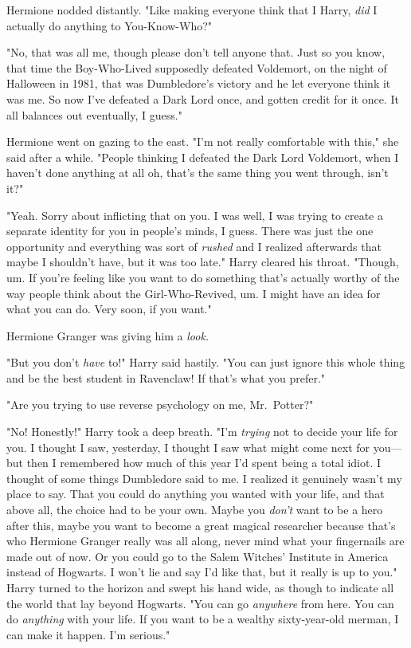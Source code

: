 Hermione nodded distantly. "Like making everyone think that I{\el} Harry,
\emph{did} I actually do anything to You-Know-Who?"

"No, that was all me, though please don't tell anyone that. Just so you know,
that time the Boy-Who-Lived supposedly defeated Voldemort, on the night of
Halloween in 1981, that was Dumbledore's victory and he let everyone think it
was me. So now I've defeated a Dark Lord once, and gotten credit for it once.
It all balances out eventually, I guess."

Hermione went on gazing to the east. "I'm not really comfortable with this,"
she said after a while. "People thinking I defeated the Dark Lord Voldemort,
when I haven't done anything at all{\el} oh, that's the same thing you went
through, isn't it?"

"Yeah. Sorry about inflicting that on you. I was{\el} well, I was trying to
create a separate identity for you in people's minds, I guess. There was just
the one opportunity and everything was sort of \emph{rushed} and{\el} I
realized afterwards that maybe I shouldn't have, but it was too late." Harry
cleared his throat. "Though, um. If you're feeling like you want to do
something that's actually worthy of the way people think about the
Girl-Who-Revived, um. I might have an idea for what you can do. Very soon, if
you want."

Hermione Granger was giving him a \emph{look.}

"But you don't \emph{have} to!" Harry said hastily. "You can just ignore this
whole thing and be the best student in Ravenclaw! If that's what you prefer."

"Are you trying to use reverse psychology on me, Mr.~Potter?"

"No! Honestly!" Harry took a deep breath. "I'm \emph{trying} not to decide your
life for you. I thought I saw, yesterday, I thought I saw what might come next
for you---but then I remembered how much of this year I'd spent being a total
idiot. I thought of some things Dumbledore said to me. I realized it genuinely
wasn't my place to say. That you could do anything you wanted with your life,
and that above all, the choice had to be your own. Maybe you \emph{don't} want
to be a hero after this, maybe you want to become a great magical researcher
because that's who Hermione Granger really was all along, never mind what your
fingernails are made out of now. Or you could go to the Salem Witches'
Institute in America instead of Hogwarts. I won't lie and say I'd like that,
but it really is up to you." Harry turned to the horizon and swept his hand
wide, as though to indicate all the world that lay beyond Hogwarts. "You can go
\emph{anywhere} from here. You can do \emph{anything} with your life. If you
want to be a wealthy sixty-year-old merman, I can make it happen. I'm serious."

